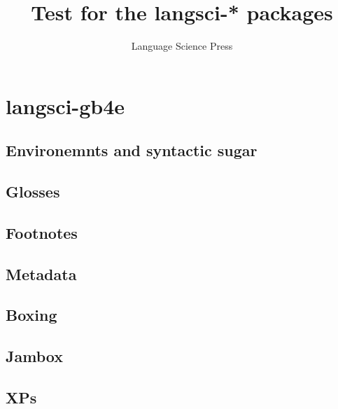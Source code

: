 \documentclass[biblatex
	      ,output=draft
	      ,nonflat
	      ,modfonts
	      ]{langsci/langscibook}
\title{Test for the langsci-* packages}
\author{Language Science Press}
\begin{document}
\maketitle
 
\section{langsci-gb4e}
\subsection{Environemnts and syntactic sugar}

% 







\subsection{Glosses}







\subsection{Footnotes}




\subsection{Metadata}

\subsection{Boxing}

% 
\subsection{Jambox}



\subsection{XPs}


  
\end{document}
